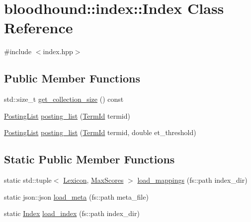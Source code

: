 \hypertarget{classbloodhound_1_1index_1_1Index}{}\section{bloodhound\+:\+:index\+:\+:Index Class Reference}
\label{classbloodhound_1_1index_1_1Index}


{\ttfamily \#include $<$index.\+hpp$>$}

\subsection*{Public Member Functions}
\begin{DoxyCompactItemize}
\item 
std\+::size\+\_\+t \hyperlink{classbloodhound_1_1index_1_1Index_afa55cbdb8bc65b9d26fcf4e560a45ab5}{get\+\_\+collection\+\_\+size} () const
\item 
\hyperlink{classbloodhound_1_1PostingList}{Posting\+List} \hyperlink{classbloodhound_1_1index_1_1Index_a4cea4ded854329f9d15071133d3623ae}{posting\+\_\+list} (\hyperlink{structbloodhound_1_1TermId}{Term\+Id} termid)
\item 
\hyperlink{classbloodhound_1_1PostingList}{Posting\+List} \hyperlink{classbloodhound_1_1index_1_1Index_a062d7a4efda34ea650b2af0f167e2afe}{posting\+\_\+list} (\hyperlink{structbloodhound_1_1TermId}{Term\+Id} termid, double et\+\_\+threshold)
\end{DoxyCompactItemize}
\subsection*{Static Public Member Functions}
\begin{DoxyCompactItemize}
\item 
static std\+::tuple$<$ \hyperlink{namespacebloodhound_a94032a3533df0a1b6d3435bad57e6499}{Lexicon}, \hyperlink{namespacebloodhound_a687d80c6f992eba8b820bf30a482f4b4}{Max\+Scores} $>$ \hyperlink{classbloodhound_1_1index_1_1Index_a1e8378387e07c097d793a585b673fbfa}{load\+\_\+mappings} (fs\+::path index\+\_\+dir)
\item 
static json\+::json \hyperlink{classbloodhound_1_1index_1_1Index_ac2bc4de183ea1d806f450366b92bb059}{load\+\_\+meta} (fs\+::path meta\+\_\+file)
\item 
static \hyperlink{classbloodhound_1_1index_1_1Index}{Index} \hyperlink{classbloodhound_1_1index_1_1Index_a6728545e1d5eaf5c5f13528c8c96a9ce}{load\+\_\+index} (fs\+::path index\+\_\+dir)
\end{DoxyCompactItemize}
